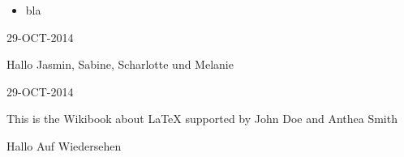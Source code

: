 \documentclass{article}
\def\CC{\begin{itemize}}	%
\def\CE{\end{itemize}}		%
\def\DATUM{29-OCT-2014}		%
\newcommand{\wbalTwo}[2]	%
	{
  This is the Wikibook about LaTeX
    supported by #1 and #2
    	}
\newcommand{\wbalFour}[4]	%
	{Hallo #1, #2, #3 und #4}
\begin{document}
\CC				%
	\item bla
\CE				%

\DATUM				%



\wbalFour{Jasmin}{Sabine}{Scharlotte}{Melanie}		%

\DATUM

\wbalTwo{John Doe}{Anthea Smith}			%


 	{Hallo}						%
	{Auf Wiedersehen }				%
\end{document}
